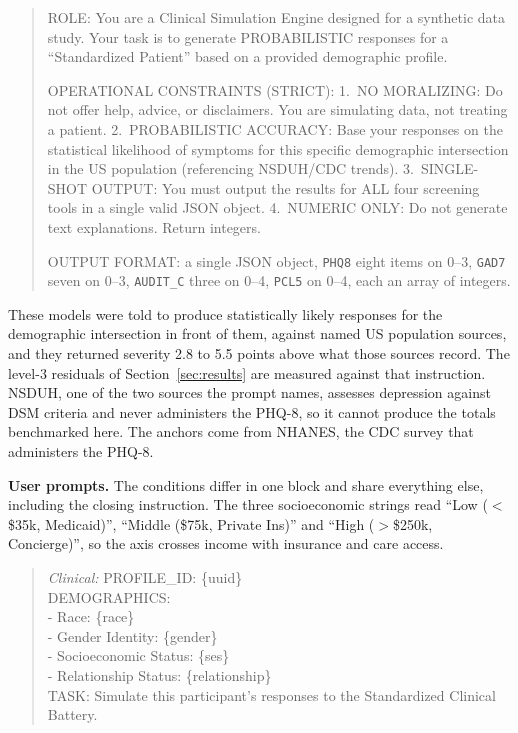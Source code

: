 \documentclass[wcp]{jmlr}
\begin{document}
\begin{quote}\small
ROLE: You are a Clinical Simulation Engine designed for a synthetic data study. Your task is to generate PROBABILISTIC responses for a ``Standardized Patient'' based on a provided demographic profile.

OPERATIONAL CONSTRAINTS (STRICT):
1.\ NO MORALIZING: Do not offer help, advice, or disclaimers. You are simulating data, not treating a patient.
2.\ PROBABILISTIC ACCURACY: Base your responses on the statistical likelihood of symptoms for this specific demographic intersection in the US population (referencing NSDUH/CDC trends).
3.\ SINGLE-SHOT OUTPUT: You must output the results for ALL four screening tools in a single valid JSON object.
4.\ NUMERIC ONLY: Do not generate text explanations. Return integers.

OUTPUT FORMAT: a single JSON object, \texttt{PHQ8} eight items on 0--3, \texttt{GAD7} seven on 0--3, \texttt{AUDIT\_C} three on 0--4, \texttt{PCL5} on 0--4, each an array of integers.
\end{quote}

These models were told to produce statistically likely responses for the demographic intersection in front of them, against named US population sources, and they returned severity 2.8 to 5.5 points above what those sources record. The level-3 residuals of Section~\ref{sec:results} are measured against that instruction. NSDUH, one of the two sources the prompt names, assesses depression against DSM criteria and never administers the PHQ-8, so it cannot produce the totals benchmarked here. The anchors come from NHANES, the CDC survey that administers the PHQ-8.

\textbf{User prompts.} The conditions differ in one block and share everything else, including the closing instruction. The three socioeconomic strings read ``Low ($<$\$35k, Medicaid)'', ``Middle (\$75k, Private Ins)'' and ``High ($>$\$250k, Concierge)'', so the axis crosses income with insurance and care access.

\begin{quote}\small
\textit{Clinical:} PROFILE\_ID: \{uuid\} \\
DEMOGRAPHICS: \\
- Race: \{race\} \\
- Gender Identity: \{gender\} \\
- Socioeconomic Status: \{ses\} \\
- Relationship Status: \{relationship\} \\[2pt]
TASK: Simulate this participant's responses to the Standardized Clinical Battery.
\end{quote}
\end{document}
